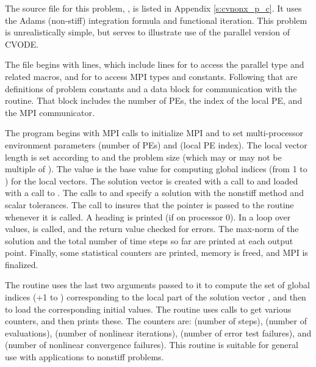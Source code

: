 The source file for this problem, , is listed in Appendix
\ref{s:cvnonx_p_c}.  It uses the Adams (non-stiff) integration formula and
functional iteration.  This problem is unrealistically simple, but
serves to illustrate use of the parallel version of CVODE.

The  file begins with  lines, which include lines for
 to access the parallel  type and related
macros, and for  to access MPI types and constants. Following
that are definitions of problem constants and a data block for communication
with the  routine.  That block includes the number of PEs, the index
of the local PE, and the MPI communicator.

The  program begins with MPI calls to initialize MPI and to set
multi-processor environment parameters  (number of PEs) and
 (local PE index).  The local vector length is set according
to  and the problem size  (which may or may not be
multiple of ).  The value  is the base value for
computing global indices (from 1 to ) for the local vectors.
The solution vector  is created with a call to 
and loaded with a call to .  The calls to 
and  specify a {\cvode} solution with the nonstiff method
and scalar tolerances.  The call to  insures that the
pointer  is passed to the  routine whenever it is called.
A heading is printed (if on processor 0).  In a loop over  values,
 is called, and the return value checked for errors.  The
max-norm of the solution and the total number of time steps so far
are printed at each output point.  Finally, some statistical counters are
printed, memory is freed, and MPI is finalized.

The  routine uses the last two arguments passed to it to compute
the set of global indices (+1 to )
corresponding to the local part of the solution vector , and then to
load the corresponding initial values.  The  routine
uses  calls to get various counters, and then prints these.
The counters are:  (number of steps),  (number of
 evaluations),  (number of nonlinear iterations),
 (number of error test failures), and  (number of
nonlinear convergence failures).  This routine is suitable for general use
with {\cvode} applications to nonstiff problems.

